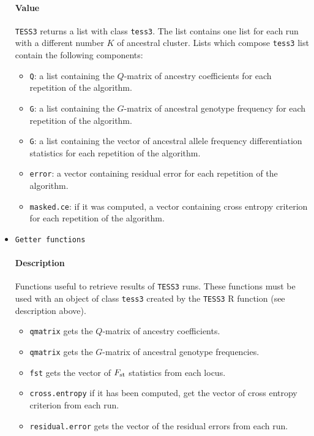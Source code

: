 \documentclass[10pt,a4paper]{article}
\begin{document}
\begin{itemize}
\paragraph{Value}
\verb|TESS3| returns a list with class \verb|tess3|. The list contains one list for each run with a different number $K$ of ancestral cluster. Lists which compose \verb|tess3| list contain the following components: 

\begin{itemize}
\item \verb|Q|: a list containing the $Q$-matrix of ancestry coefficients for each repetition of the algorithm.
\item \verb|G|: a list containing the $G$-matrix of ancestral genotype frequency for each repetition of the algorithm.
\item \verb|G|: a list containing the vector of ancestral allele frequency differentiation statistics for each repetition of the algorithm.
\item \verb|error|: a vector containing residual error for each repetition of the algorithm.
\item \verb|masked.ce|: if it was computed, a vector containing cross entropy criterion for each repetition of the algorithm.
\end{itemize}


\item \verb|Getter functions|

\paragraph{Description}
Functions useful to retrieve results of {\tt TESS3} runs. These functions must be used with an object of class \verb|tess3| created by the \verb|TESS3| R function (see description above).

\begin{itemize}
  \item[] \verb|qmatrix| gets the $Q$-matrix of ancestry coefficients.
  \item[] \verb|qmatrix| gets the $G$-matrix of ancestral genotype frequencies.
  \item[] \verb|fst| gets the vector of $F_{\rm st}$ statistics from each locus.
  \item[] \verb|cross.entropy| if it has been computed, get the vector of cross entropy criterion from each run.
  \item[] \verb|residual.error| gets the vector of the residual errors from each run.
\end{itemize}



\end{itemize}
\end{document}
